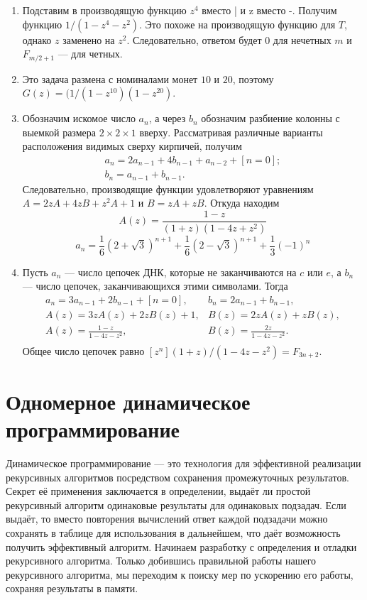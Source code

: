 \documentclass[14pt,openany]{book}
\begin{document}
\begin{enumerate}
\item Подставим в производящую функцию $z^4$ вместо | и z вместо -. Получим функцию $1/(1-z^4-z^2)$.
Это похоже на производящую функцию для $T$, однако $z$ заменено на $z^2$. Следовательно, 
ответом будет $0$ для нечетных $m$ и $F_{m/2+1}$ --- для четных.

\item Это задача размена с номиналами монет $10$ и $20$, поэтому $G(z)=(1/(1-z^{10})(1-z^{20})$.

\item Обозначим искомое число $a_n$, а через $b_n$ обозначим разбиение колонны с выемкой размера
      $2 \times 2 \times 1$ вверху. Рассматривая различные варианты расположения видимых сверху
      кирпичей, получим
$$
\begin{array}{ll}
a_n = 2a_{n-1} + 4b_{n-1} + a_{n-2} + [n=0]; \\
b_n = a_{n-1} + b_{n-1}.
\end{array}
$$
      Следовательно, производящие функции удовлетворяют уравнениям $A = 2zA+4zB+z^2A+1$ и
      $B = zA + zB$. Откуда находим $$A(z) = \frac{1-z}{(1+z)(1-4z+z^2)}$$
      $$a_n = \frac{1}{6}(2+\sqrt{3})^{n+1} + \frac{1}{6}(2-\sqrt{3})^{n+1} + \frac{1}{3}(-1)^n$$

\item Пусть $a_n$ --- число цепочек ДНК, которые не заканчиваются на $c$ или $e$, а $b_n$ --- число
      цепочек, заканчивающихся этими символами. Тогда
      $$
      \begin{array}{ll}
      a_n = 3a_{n-1}+2b_{n-1}+[n=0], & b_n = 2a_{n-1} + b_{n-1}, \\
      A(z) = 3zA(z) + 2zB(z) + 1,    & B(z) = 2zA(z) + zB(z), \\
      A(z) = \frac{1-z}{1-4z-z^2},   & B(z) = \frac{2z}{1-4z-z^2}. \\
      \end{array}
      $$
      Общее число цепочек равно $[z^n](1+z)/(1-4z-z^2) = F_{3n+2}$.


\end{enumerate}

\chapter{Одномерное динамическое программирование}

Динамическое программирование --- это технология для эффективной реализации рекурсивных алгоритмов
посредством сохранения промежуточных результатов. Секрет её применения заключается
в определении, выдаёт ли простой рекурсивный алгоритм одинаковые результаты для одинаковых
подзадач. Если выдаёт, то вместо повторения вычислений ответ каждой подзадачи можно
сохранять в таблице для использования в дальнейшем, что даёт возможность получить эффективный
алгоритм. Начинаем разработку с определения и отладки рекурсивного алгоритма. Только добившись
правильной работы нашего рекурсивного алгоритма, мы переходим к поиску мер по ускорению
его работы, сохраняя результаты в памяти.
\end{document}
